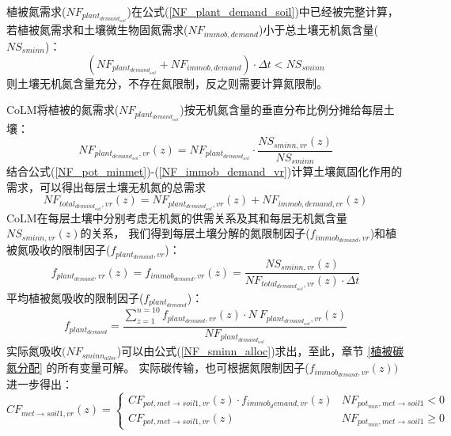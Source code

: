 植被氮需求($NF_{plant_{demand_{soil}}}$)在公式(\ref{NF_plant_demand_soil})中已经被完整计算，若植被氮需求和土壤微生物固氮需求($NF_{immob,demand}$)小于总土壤无机氮含量(${NS}_{sminn}$)：
\begin{equation}
    \left(NF_{plant_{demand_{soil}}}+NF_{immob,demand}\right)\cdot\Delta t<NS_{sminn}
\end{equation}
则土壤无机氮含量充分，不存在氮限制，反之则需要计算氮限制。

CoLM将植被的氮需求($NF_{plant_{demand_{soil}}}$)按无机氮含量的垂直分布比例分摊给每层土壤：
\begin{equation}
    NF_{plant_{demand_{soil}},vr}\left(z\right)=NF_{plant_{demand_{soil}}}\cdot\frac{NS_{sminn,vr}\left(z\right)}{NS_{sminn}}
\end{equation}
结合公式(\ref{NF_pot_minmet})-(\ref{NF_immob_demand_vr})计算土壤氮固化作用的需求，可以得出每层土壤无机氮的总需求
\begin{equation}
    NF_{total_{demand_{soil}},vr}\left(z\right)=NF_{plant_{demand_{soil}},vr}\left(z\right)+NF_{immob,demand,vr}\left(z\right)
\end{equation}
CoLM在每层土壤中分别考虑无机氮的供需关系及其和每层无机氮含量${NS}_{sminn,vr}\left(z\right)$的关系，
我们得到每层土壤分解的氮限制因子($f_{immob_{demand},vr}$)和植被氮吸收的限制因子($f_{plant_{demand},vr}$)：
\begin{equation}
    f_{plant_{demand},vr}\left(z\right)=f_{immob_{demand},vr}\left(z\right)=\frac{NS_{sminn,vr}\left(z\right)}{NF_{total_{demand_{soil}},vr}\left(z\right)\cdot\Delta t}
\end{equation}
平均植被氮吸收的限制因子($f_{plant_{demand}}$)：
\begin{equation}
    f_{plant_{demand}}=\frac{\sum_{z=1}^{n=10}{f_{plant_{demand},vr}\left(z\right)\cdot N\ F_{plant_{demand_{soil}},vr}\left(z\right)}}{NF_{plant_{demand_{soil}}}}
\end{equation}
实际氮吸收$(NF_{sminn_{alloc}}$)可以由公式(\ref{NF_sminn_alloc})求出，至此，章节 \ref{植被碳氮分配} 的所有变量可解。
实际碳传输，也可根据氮限制因子($f_{immob_{demand},vr}\left(z\right))$进一步得出：
\begin{equation}
C F_{met \rightarrow { soil1,vr }}(z)=\left\{\begin{array}{ll}C F_{pot, met \rightarrow soil1, vr}(z) \cdot f_{{immob }_{d} { emand }, vr}(z) & N F_{pot_{m in }, { met } \rightarrow { soil } 1}<0 \\ C F_{pot, met \rightarrow { soil1,vr }}(z) & N F_{pot_{m in }, { met } \rightarrow { soil } 1} \geq 0\end{array}\right.
\end{equation}
